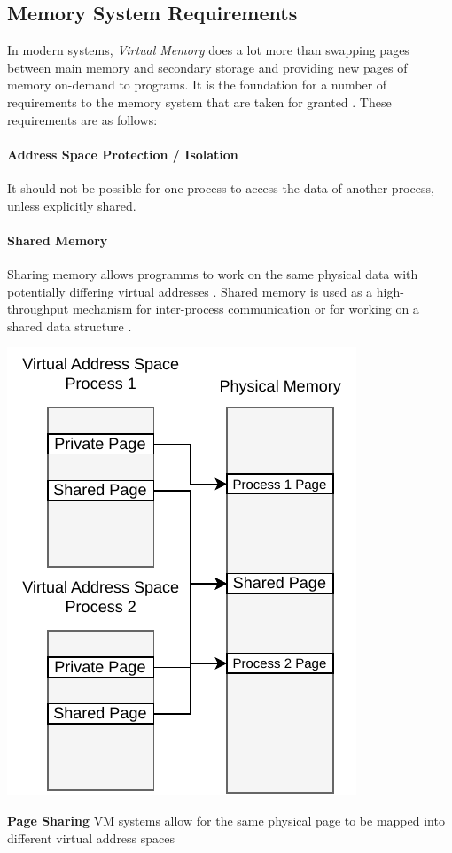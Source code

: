 \subsection{Memory System Requirements}
In modern systems, \textit{Virtual Memory} does a lot more than swapping pages between main memory and secondary
storage and providing new pages of memory on-demand to programs.
It is the foundation for a number of requirements to the memory system that are taken for granted
\cite{jacobSoftwaremanagedAddressTranslation1997}.
These requirements are as follows:


\paragraph{Address Space Protection / Isolation} It should not be possible for one process to access the data
of another process, unless explicitly shared.
\cite{jacobVirtualMemoryContemporary1998}


\paragraph{Shared Memory} Sharing memory allows programms to work on the same physical data with potentially
differing virtual addresses \cite{jacobVirtualMemoryContemporary1998}.
Shared memory is used as a high-throughput mechanism for inter-process communication or for working on
a shared data structure \cite{tanenbaumOS}.

\begin{marginfigure}
    \includegraphics*[width=1\marginparwidth]{figures/fund_share.pdf}
    \caption{\textbf{Page Sharing} VM systems allow for the same physical page to be mapped into different virtual address spaces}
\end{marginfigure}

